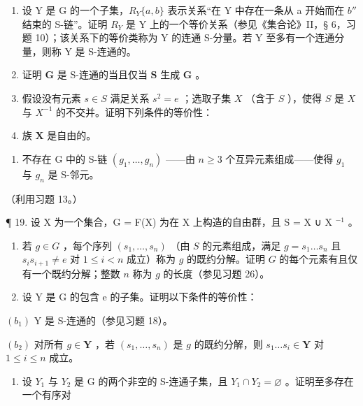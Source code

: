 \begin{enumerate}
\def\labelenumi{(\alph{enumi})}
\item
  设 Y 是 G 的一个子集，\(R_{Y}\{a, b\}\) 表示关系“在 Y 中存在一条从 a 开始而在 \(b''\) 结束的 S-链”。证明 \(R_{Y}\) 是 Y 上的一个等价关系（参见《集合论》II，§ 6，习题 10）；该关系下的等价类称为 Y 的连通 S-分量。若 Y 至多有一个连通分量，则称 Y 是 S-连通的。
\item
  证明 \(\mathbf{G}\) 是 S-连通的当且仅当 \(\mathbf{S}\) 生成 \(\mathbf{G}\) 。
\item
  假设没有元素 \(s \in S\) 满足关系 \(s^2 = e\) ；选取子集 \(X\) （含于 \(S\) ），使得 \(S\) 是 \(X\) 与 \(X^{-1}\) 的不交并。证明下列条件的等价性：
\item
  族 \(\mathbf{X}\) 是自由的。
\end{enumerate}

\begin{enumerate}
\def\labelenumi{(\roman{enumi})}
\setcounter{enumi}{1}
\tightlist
\item
  不存在 G 中的 S-链 \((g_{1},\ldots ,g_{n})\) ——由 \(n\geqslant 3\) 个互异元素组成——使得 \(g_{1}\) 与 \(g_{n}\) 是 S-邻元。
\end{enumerate}

（利用习题 13。）

¶ 19. 设 X 为一个集合，G = F(X) 为在 X 上构造的自由群，且 S = X ∪ X \(^{-1}\) 。

\begin{enumerate}
\def\labelenumi{(\alph{enumi})}
\item
  若 \(g \in G\) ，每个序列 \((s_1, \ldots, s_n)\) （由 \(S\) 的元素组成，满足 \(g = s_1 \ldots s_n\) 且 \(s_i s_{i+1} \neq e\) 对 \(1 \leqslant i < n\) 成立）称为 \(g\) 的既约分解。证明 \(G\) 的每个元素有且仅有一个既约分解；整数 \(n\) 称为 \(g\) 的长度（参见习题 26）。
\item
  设 Y 是 G 的包含 e 的子集。证明以下条件的等价性：
\end{enumerate}

\((b_{1})\) Y 是 S-连通的（参见习题 18）。

\((b_{2})\) 对所有 \(g \in \mathbf{Y}\) ，若 \((s_1, \ldots, s_n)\) 是 \(g\) 的既约分解，则 \(s_1 \ldots s_i \in \mathbf{Y}\) 对 \(1 \leqslant i \leqslant n\) 成立。

\begin{enumerate}
\def\labelenumi{(\alph{enumi})}
\setcounter{enumi}{2}
\tightlist
\item
  设 \(Y_{1}\) 与 \(Y_{2}\) 是 G 的两个非空的 S-连通子集，且 \(Y_{1} \cap Y_{2} = \varnothing\) 。证明至多存在一个有序对
\end{enumerate}

